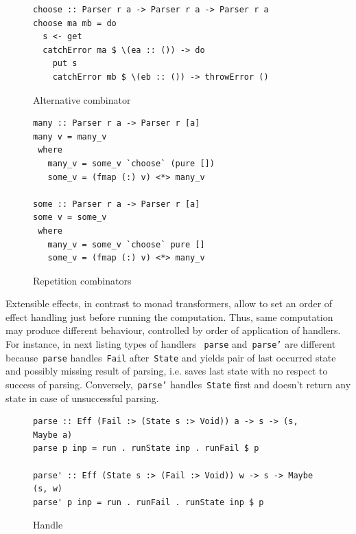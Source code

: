       \begin{figure}[h]
      \begin{lstlisting}
choose :: Parser r a -> Parser r a -> Parser r a
choose ma mb = do
  s <- get
  catchError ma $ \(ea :: ()) -> do
    put s
    catchError mb $ \(eb :: ()) -> throwError ()
      \end{lstlisting}
      \caption{Alternative combinator}
      \label{listing:ExtEffParsersChoose}
      \end{figure}

      \begin{figure}[h]
      \begin{lstlisting}
many :: Parser r a -> Parser r [a]
many v = many_v
 where
   many_v = some_v `choose` (pure [])
   some_v = (fmap (:) v) <*> many_v

some :: Parser r a -> Parser r [a]
some v = some_v
 where
   many_v = some_v `choose` pure []
   some_v = (fmap (:) v) <*> many_v
      \end{lstlisting}
      \caption{Repetition combinators}
      \label{listing:ExtEffParsersManySome}
      \end{figure}

      Extensible effects, in contrast to monad transformers, allow to set an order of
      effect handling just before running the computation. Thus, same computation may
      produce different behaviour, controlled by order of application of
      handlers. For instance, in next listing types of handlers
      ~\texttt{parse} and~\texttt{parse'} are different because~\texttt{parse}
      handles~\texttt{Fail} after~\texttt{State} and yields pair of last occurred
      state and possibly missing result of parsing, i.e. saves last state with no respect
      to success of parsing. Conversely,~\texttt{parse'} handles~\texttt{State}
      first and doesn't return any state in case of unsuccessful parsing.

      \begin{figure}[h]
      \begin{lstlisting}
parse :: Eff (Fail :> (State s :> Void)) a -> s -> (s, Maybe a)
parse p inp = run . runState inp . runFail $ p

parse' :: Eff (State s :> (Fail :> Void)) w -> s -> Maybe (s, w)
parse' p inp = run . runFail . runState inp $ p
      \end{lstlisting}
      \caption{Handle}
      \label{listing:ExtEffParsersParse}
      \end{figure}

